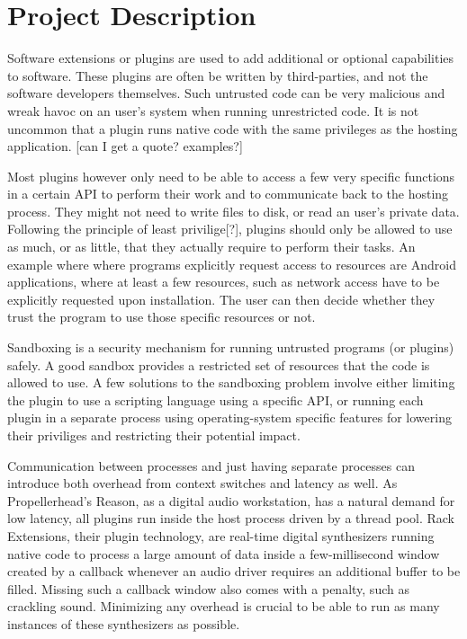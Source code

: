 \chapter* {Project Description}

Software extensions or plugins are used to add additional or optional
capabilities to software. These plugins are often be written by third-parties,
and not the software developers themselves. Such untrusted code can be very
malicious and wreak havoc on an user's system when running unrestricted code. It
is not uncommon that a plugin runs native code with the same privileges as the
hosting application. [can I get a quote? examples?]

Most plugins however only need to be able to access a few very specific
functions in a certain API to perform their work and to communicate back to the
hosting process. They might not need to write files to disk, or read an user's
private data. Following the principle of least privilige[?], plugins should only
be allowed to use as much, or as little, that they actually require to perform
their tasks. An example where where programs explicitly request access to
resources are Android applications, where at least a few resources, such as
network access have to be explicitly requested upon installation. The user can
then decide whether they trust the program to use those specific resources or
not.

Sandboxing is a security mechanism for running untrusted programs (or plugins)
safely. A good sandbox provides a restricted set of resources that the code is
allowed to use. A few solutions to the sandboxing problem involve either
limiting the plugin to use a scripting language using a specific API, or running
each plugin in a separate process using operating-system specific features for
lowering their priviliges and restricting their potential impact.

Communication between processes and just having separate processes can introduce
both overhead from context switches and latency as well. As Propellerhead's
Reason, as a digital audio workstation, has a natural demand for low latency,
all plugins run inside the host process driven by a thread pool. Rack
Extensions, their plugin technology, are real-time digital synthesizers running
native code to process a large amount of data inside a few-millisecond window
created by a callback whenever an audio driver requires an additional buffer to
be filled. Missing such a callback window also comes with a penalty, such as
crackling sound. Minimizing any overhead is crucial to be able to run as many
instances of these synthesizers as possible.

